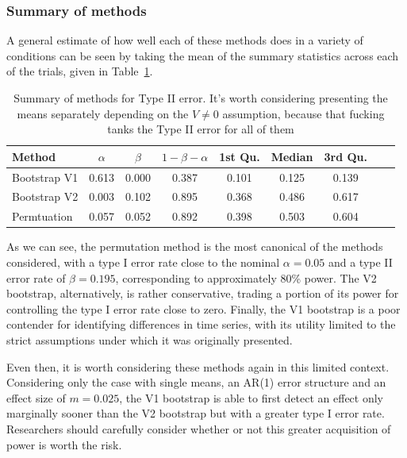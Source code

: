 \documentclass{article}
\begin{document}
\subsubsection{Summary of methods}

A general estimate of how well each of these methods does in a variety of conditions can be seen by taking the mean of the summary statistics across each of the trials, given in Table~\ref{tab:type_2_summary}.

\begin{table}[H]
\centering
\begin{tabular}{lcccccccc}
  \hline
Method & $\alpha$ & $\beta$ & $1 - \beta - \alpha$  & 1st Qu. & Median & 3rd Qu.  \\ 
  \hline
Bootstrap V1 & 0.613 & 0.000 & 0.387 & 0.101 & 0.125 & 0.139 \\ 
  Bootstrap V2 & 0.003 & 0.102 & 0.895 & 0.368 & 0.486 & 0.617 \\ 
  Permtuation & 0.057 & 0.052 & 0.892 & 0.398 & 0.503 & 0.604 \\ 
   \hline
\end{tabular}
\caption{Summary of methods for Type II error. It's worth considering presenting the means separately depending on the $V \not=0$ assumption, because that fucking tanks the Type II error for all of them} 
\label{tab:type_2_summary}
\end{table}

As we can see, the permutation method is the most canonical of the methods considered, with a type I error rate close to the nominal $\alpha = 0.05$ and a type II error rate of $\beta = 0.195$, corresponding to approximately 80\% power. The V2 bootstrap, alternatively, is rather conservative, trading a portion of its power for controlling the type I error rate close to zero. Finally, the V1 bootstrap is a poor contender for identifying differences in time series, with its utility limited to the strict assumptions under which it was originally presented.

Even then, it is worth considering these methods again in this limited context. Considering only the case with single means, an AR(1) error structure and an effect size of $m = 0.025$, the V1 bootstrap is able to first detect an effect only marginally sooner than the V2 bootstrap but with a greater type I error rate. Researchers should carefully consider whether or not this greater acquisition of power is worth the risk.
\end{document}
